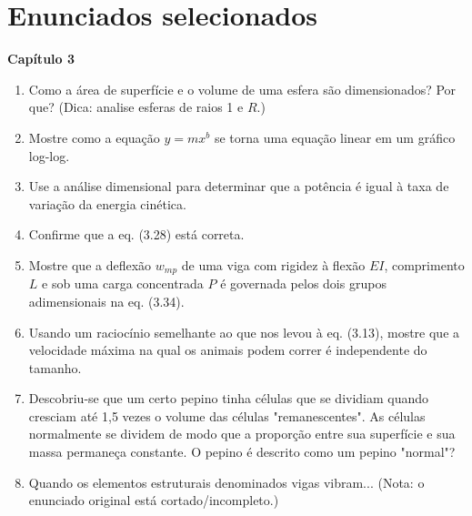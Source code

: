 \section*{Enunciados selecionados}

\textbf{Capítulo 3}
\begin{enumerate}
  \item[3.3] Como a área de superfície e o volume de uma esfera são dimensionados? Por que? (Dica: analise esferas de raios 1 e $R$.)
  \item[3.6] Mostre como a equação $y = m x^b$ se torna uma equação linear em um gráfico log-log.
  \item[3.9] Use a análise dimensional para determinar que a potência é igual à taxa de variação da energia cinética.
  \item[3.18] Confirme que a eq. (3.28) está correta.
  \item[3.19] Mostre que a deflexão $w_{mp}$ de uma viga com rigidez à flexão $EI$, comprimento $L$ e sob uma carga concentrada $P$ é governada pelos dois grupos adimensionais na eq. (3.34).
  \item[3.28] Usando um raciocínio semelhante ao que nos levou à eq. (3.13), mostre que a velocidade máxima na qual os animais podem correr é independente do tamanho.
  \item[3.32] Descobriu-se que um certo pepino tinha células que se dividiam quando cresciam até 1,5 vezes o volume das células "remanescentes". As células normalmente se dividem de modo que a proporção entre sua superfície e sua massa permaneça constante. O pepino é descrito como um pepino "normal"?
  \item[3.35] Quando os elementos estruturais denominados vigas vibram... (Nota: o enunciado original está cortado/incompleto.)
\end{enumerate}

